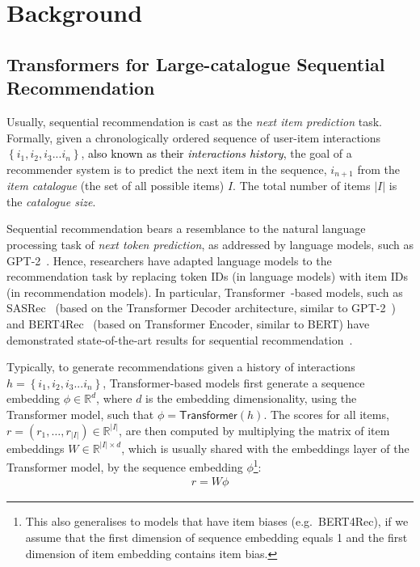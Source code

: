 \documentclass[sigconf,natbib=true, review=true]{acmart} %
\newcommand{\nt}[1]{\textcolor{black}{#1}}
\begin{document}
\section{Background} \label{ssec:recsys:preliminarilies}
\subsection{Transformers for Large-catalogue Sequential Recommendation}\label{sec:rec}

 Usually, sequential recommendation is cast as the \emph{next item prediction} task. Formally, given a chronologically ordered sequence of user-item interactions $\left\{i_1, i_2, i_3 ... i_n\right\}$, \nt{also known as their \textit{interactions history},} the goal of a recommender system is to predict the next item in the sequence, $i_{n+1}$ from the \emph{item catalogue} (the set of all possible items) $I$. The total number of items $|I|$ is the \emph{catalogue size}.

Sequential recommendation bears a resemblance to the natural language processing task of \emph{next token prediction}, as addressed by language models, such as GPT-2~\cite{gpt2}.
Hence, researchers have adapted language models to the recommendation task by replacing token IDs (in language models) with item IDs (in recommendation models). In particular, Transformer~\cite{Transformer}-based models, such as SASRec~\cite{SASRec} (based on the Transformer Decoder architecture, similar to GPT-2~\cite{gpt2})  and BERT4Rec~\cite{BERT4Rec} (based on Transformer Encoder, similar to BERT) have demonstrated state-of-the-art results for sequential recommendation~\cite{Bert4RecRepro}. 


Typically, to generate recommendations given a history of interactions $h = \left\{i_1, i_2, i_3 ... i_n\right\}$, Transformer-based models first generate a sequence embedding $\phi \in \mathbb{R}^d$, where $d$ is the embedding dimensionality, using the Transformer model, such that $\phi =  \textsf{Transformer}(h)$.
The scores for all items, $r = (r_1, \ldots, r_{|I|}) \in \mathbb{R}^{|I|}$, are then computed by multiplying the matrix of item embeddings $W \in \mathbb{R}^{|I|\times d}$, which is usually shared with the embeddings layer of the Transformer model, by the sequence embedding $\phi$\footnote{This also generalises to models that have item biases (e.g.\ BERT4Rec), if we assume that the first dimension of sequence embedding equals 1 and the first dimension of item embedding contains item bias.}:
\begin{align}
r = W\phi\label{eq:scores}
\end{align}
\end{document}
